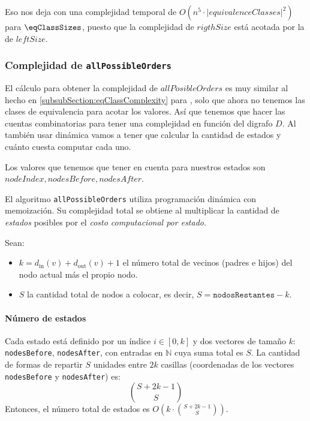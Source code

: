 Eso nos deja con una complejidad temporal de $O(n^5 \cdot |equivalenceClasses|^2)$ para $\eqClassSizes$, puesto que la complejidad de $rigthSize$ está acotada por la de $leftSize$.



\subsubsection{Complejidad de \texttt{allPossibleOrders}} \label{subsubSection:allPosibleOrdersComplexity}

El cálculo para obtener la complejidad de $allPosibleOrders$ es muy similar al hecho en \ref{subsubSection:eqClassComplexity} para \leftPossibleOrders, solo que ahora no tenemos las clases de equivalencia para acotar los valores. Así que tenemos que hacer las cuentas combinatorias para tener una complejidad en función del digrafo $D$. Al también usar dinámica vamos a tener que calcular la cantidad de estados y cuánto cuesta computar cada uno. 

Los valores que tenemos que tener en cuenta para nuestros estados son $nodeIndex, nodesBefore, nodesAfter$. 

El algoritmo \texttt{allPossibleOrders} utiliza programación dinámica con memoización. Su complejidad total se obtiene al multiplicar la cantidad de \emph{estados} posibles por el \emph{costo computacional por estado}.

Sean:
\begin{itemize}
    \item $k = d_{\text{in}}(v) + d_{\text{out}}(v) + 1$ el número total de vecinos (padres e hijos) del nodo actual más el propio nodo.
    \item $S$ la cantidad total de nodos a colocar, es decir, $S = \texttt{nodosRestantes} - k$.
\end{itemize}

\paragraph{Número de estados} Cada estado está definido por un índice $i \in [0, k]$ y  dos vectores de tamaño $k$: \texttt{nodesBefore}, \texttt{nodesAfter}, con entradas en $\mathbb{N}$ cuya suma total es $S$. La cantidad de formas de repartir $S$ unidades entre $2k$ casillas (coordenadas de los vectores \texttt{nodesBefore} y \texttt{nodesAfter}) es:
\[
\binom{S + 2k - 1}{S}
\]
Entonces, el número total de estados es $O\left(k \cdot \binom{S + 2k - 1}{S}\right).$

